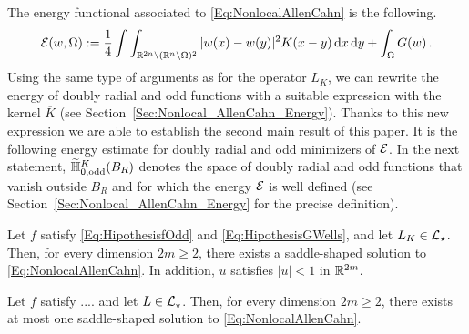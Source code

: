 The energy functional associated to \eqref{Eq:NonlocalAllenCahn} is the following.
\begin{equation}
\label{Eq:Energy}
\mathcal{E}(w, \Omega) := \dfrac{1}{4}\int\int_{\mathbb{R}^{2n} \setminus (\mathbb{R}^n\setminus\Omega)^2} |w(x) - w(y)|^2 K(x-y) \,\mathrm{d} x \,\mathrm{d} y + \int_{\Omega} G(w)\,.
\end{equation}
Using the same type of arguments as for the operator $L_K$, we can rewrite the energy of doubly radial and odd functions with a suitable expression with the kernel $\overline{K}$ (see Section~\ref{Sec:Nonlocal_AllenCahn_Energy}). Thanks to this new expression we are able to establish the second main result of this paper. It is the following energy estimate for doubly radial and odd minimizers of $\mathcal{E}$. In the next statement, $\widetilde{\mathbb{H}}^K_{0, \mathrm{odd}}(B_R)$ denotes the space of doubly radial and odd functions that vanish outside $B_R$ and for which the energy $\mathcal{E}$ is well defined (see Section~\ref{Sec:Nonlocal_AllenCahn_Energy} for the precise definition).



\begin{theorem}
	\label{Th:Existence}
	Let $f$ satisfy \eqref{Eq:HipothesisfOdd} and \eqref{Eq:HipothesisGWells}, and let $L_K\in \mathcal{L}_\star$. Then, for every dimension $2m \geq 2$, there exists a saddle-shaped solution to \eqref{Eq:NonlocalAllenCahn}. In addition, $u$ satisfies $|u|<1$ in $\mathbb{R}^{2m}$.
\end{theorem}






\begin{theorem}
	\label{Th:Uniqueness}
    Let $f$ satisfy .... and let $L\in \mathcal{L}_\star$. Then, for every dimension $2m \geq 2$, there exists at most one saddle-shaped solution to \eqref{Eq:NonlocalAllenCahn}.
\end{theorem}

